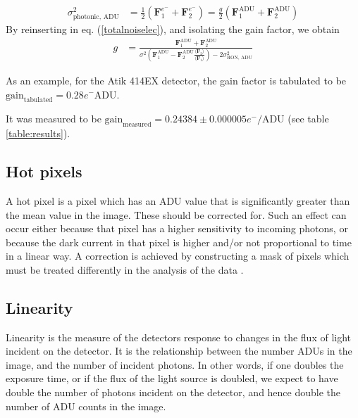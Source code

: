 \documentclass[../main.tex]{subfiles}
\begin{document}
	\begin{align}
		\sigma_\text{photonic, ADU}^2 &= \frac12\left( \bm F_{1}^{e^-} + \bm F_{2}^{e^-} \right) = \frac{g}{2} \left(\bm F_{1}^\text{ADU} + \bm F_{2}^\text{ADU}\right)
	\end{align}
	By reinserting in eq. (\ref{totalnoiselec}), and isolating the gain factor, we obtain
	\begin{align}\label{eq:gainfactorest}
		g &=  \frac{\bm F_{1}^\text{ADU} + \bm F_{2}^\text{ADU} }{\sigma^2 \left(\bm F_1^\text{ADU} - \bm F_2^\text{ADU}\frac{\langle \bm F_2\rangle }{\langle \bm F_1\rangle }\right) - 2\sigma_\text{RON, ADU}^2}
	\end{align}
	
	 As an example, for the Atik 414EX detector, the gain factor is tabulated to be $\text{gain}_\text{tabulated} = 0.28 e^-\text{ADU}$\cite{atik414specs}. 
	 
	 It was measured to be $\text{gain}_\text{measured} = 0.24384\pm 0.000005 e^-/\text{ADU}$ (see table \ref{table:results}).
	
	\subsection{Hot pixels}
	A hot pixel is a pixel which has an ADU value that is significantly greater than the mean value in the image\cite{CCDdatareductionguide}. These should be corrected for. Such an effect can occur either because that pixel has a higher sensitivity to incoming photons, or because the dark current in that pixel is higher and/or not proportional to time in a linear way\cite{CCDdatareductionguide}. 
	A correction is achieved by constructing a mask of pixels which must be treated differently in the analysis of the data \cite{CCDdatareductionguide}.
	
	\subsection{Linearity}\label{sec:linearity}
	Linearity is the measure of the detectors response to changes in the flux of light incident on the detector. It is the relationship between the number ADUs in the image, and the number of incident photons. In other words, if one doubles the exposure time, or if the flux of the light source is doubled, we expect to have double the number of photons incident on the detector, and hence double the number of ADU counts in the image. 
	
\end{document}
